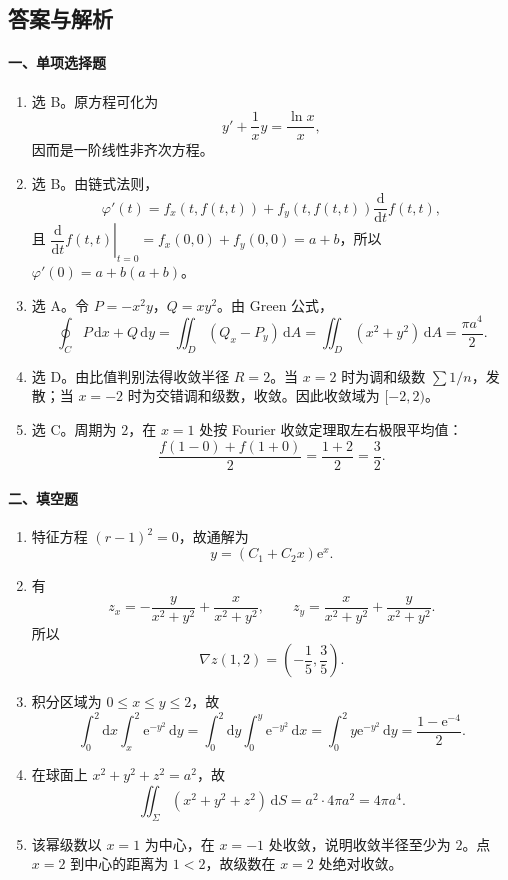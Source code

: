 \subsection{答案与解析}
\paragraph*{一、单项选择题}
\begin{enumerate}
  \item 选 B。原方程可化为
  \[
    y'+\frac1x y=\frac{\ln x}{x},
  \]
  因而是一阶线性非齐次方程。

  \item 选 B。由链式法则，
  \[
    \varphi'(t)=f_x(t,f(t,t))+f_y(t,f(t,t))\frac{\mathrm{d}}{\mathrm{d}t}f(t,t),
  \]
  且 \(\left.\dfrac{\mathrm{d}}{\mathrm{d}t}f(t,t)\right|_{t=0}=f_x(0,0)+f_y(0,0)=a+b\)，所以
  \(\varphi'(0)=a+b(a+b)\)。

  \item 选 A。令 \(P=-x^2y\)，\(Q=xy^2\)。由 Green 公式，
  \[
    \oint_C P\,\mathrm{d}x+Q\,\mathrm{d}y
    =\iint_D(Q_x-P_y)\,\mathrm{d}A
    =\iint_D(x^2+y^2)\,\mathrm{d}A
    =\frac{\pi a^4}{2}.
  \]

  \item 选 D。由比值判别法得收敛半径 \(R=2\)。当 \(x=2\) 时为调和级数 \(\sum 1/n\)，发散；当 \(x=-2\) 时为交错调和级数，收敛。因此收敛域为 \([-2,2)\)。

  \item 选 C。周期为 \(2\)，在 \(x=1\) 处按 Fourier 收敛定理取左右极限平均值：
  \[
    \frac{f(1-0)+f(1+0)}2=\frac{1+2}{2}=\frac32.
  \]
\end{enumerate}

\paragraph*{二、填空题}
\begin{enumerate}
  \item 特征方程 \((r-1)^2=0\)，故通解为
  \[
    y=(C_1+C_2x)\mathrm{e}^x.
  \]

  \item 有
  \[
    z_x=-\frac{y}{x^2+y^2}+\frac{x}{x^2+y^2},\qquad
    z_y=\frac{x}{x^2+y^2}+\frac{y}{x^2+y^2}.
  \]
  所以
  \[
    \nabla z(1,2)=\left(-\frac15,\frac35\right).
  \]

  \item 积分区域为 \(0\le x\le y\le 2\)，故
  \[
    \int_0^2\mathrm{d}x\int_x^2 \mathrm{e}^{-y^2}\,\mathrm{d}y
    =\int_0^2\mathrm{d}y\int_0^y \mathrm{e}^{-y^2}\,\mathrm{d}x
    =\int_0^2y\mathrm{e}^{-y^2}\,\mathrm{d}y
    =\frac{1-\mathrm{e}^{-4}}2.
  \]

  \item 在球面上 \(x^2+y^2+z^2=a^2\)，故
  \[
    \iint_\Sigma (x^2+y^2+z^2)\,\mathrm{d}S=a^2\cdot 4\pi a^2=4\pi a^4.
  \]

  \item 该幂级数以 \(x=1\) 为中心，在 \(x=-1\) 处收敛，说明收敛半径至少为 \(2\)。点 \(x=2\) 到中心的距离为 \(1<2\)，故级数在 \(x=2\) 处绝对收敛。
\end{enumerate}

